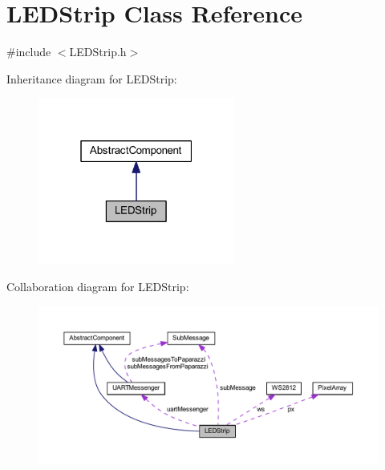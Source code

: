 \hypertarget{class_l_e_d_strip}{}\section{L\+E\+D\+Strip Class Reference}
\label{class_l_e_d_strip}


{\ttfamily \#include $<$L\+E\+D\+Strip.\+h$>$}



Inheritance diagram for L\+E\+D\+Strip\+:\nopagebreak
\begin{figure}[H]
\begin{center}
\leavevmode
\includegraphics[width=183pt]{class_l_e_d_strip__inherit__graph}
\end{center}
\end{figure}


Collaboration diagram for L\+E\+D\+Strip\+:\nopagebreak
\begin{figure}[H]
\begin{center}
\leavevmode
\includegraphics[width=350pt]{class_l_e_d_strip__coll__graph}
\end{center}
\end{figure}
